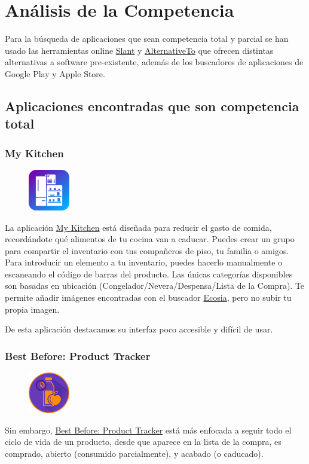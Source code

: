 \chapter{Análisis de la Competencia}
Para la búsqueda de aplicaciones que sean competencia total y parcial se han usado las herramientas online \href{https://www.slant.co}{Slant} y \href{https://alternativeto.net}{AlternativeTo} que ofrecen distintas alternativas a software pre-existente, además de los buscadores de aplicaciones de Google Play y Apple Store.

\section{Aplicaciones encontradas que son competencia total}
\subsection{My Kitchen}
\begin{figure}
\vspace{-.5cm}
\includegraphics[trim,width=1.8cm]{images/mykitchen.png}
\end{figure}

La aplicación \href{https://play.google.com/store/apps/details?id=com.peytu.bestbefore}{My Kitchen} está diseñada para reducir el gasto de comida, recordándote qué alimentos de tu cocina van a caducar. Puedes crear un grupo para compartir el inventario con tus compañeros de piso, tu familia o amigos. Para introducir un elemento a tu inventario, puedes hacerlo manualmente o escaneando el código de barras del producto. Las únicas categorías disponibles son basadas en ubicación (Congelador/Nevera/Despensa/Lista de la Compra). Te permite añadir imágenes encontradas con el buscador \href{https://www.ecosia.org/}{Ecosia}, pero no subir tu propia imagen.

De esta aplicación destacamos su interfaz poco accesible y difícil de usar.

\subsection{Best Before: Product Tracker}
\begin{figure}
\flushright
\vspace{-1cm}
\includegraphics[trim,width=1.8cm]{images/bestbefore.png}
\end{figure}
Sin embargo, \href{https://play.google.com/store/apps/details?id=com.peytu.bestbefore}{Best Before: Product Tracker} está más enfocada a seguir todo el ciclo de vida de un producto, desde que aparece en la lista de la compra, es comprado, abierto (consumido parcialmente), y acabado (o caducado).

